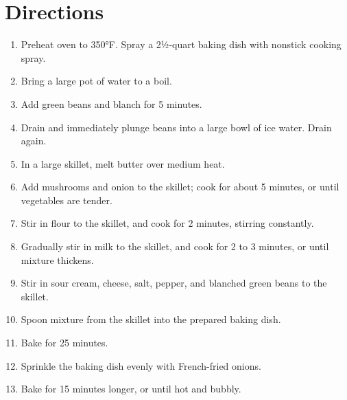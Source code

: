 \documentclass[11pt,letterpaper]{article}
\begin{document}
\section*{Directions}
\begin{enumerate}
    \item Preheat oven to 350°F. Spray a 2½-quart baking dish with nonstick cooking spray.
    \item Bring a large pot of water to a boil.
		\item Add green beans and blanch for 5 minutes.
		\item Drain and immediately plunge beans into a large bowl of ice water. Drain again.
    \item In a large skillet, melt butter over medium heat.
    \item Add mushrooms and onion to the skillet; cook for about 5 minutes, or until vegetables are tender.
    \item Stir in flour to the skillet, and cook for 2 minutes, stirring constantly.
    \item Gradually stir in milk to the skillet, and cook for 2 to 3 minutes, or until mixture thickens.
    \item Stir in sour cream, cheese, salt, pepper, and blanched green beans to the skillet.
    \item Spoon mixture from the skillet into the prepared baking dish.
    \item Bake for 25 minutes.
    \item Sprinkle the baking dish evenly with French-fried onions.
    \item Bake for 15 minutes longer, or until hot and bubbly.
\end{enumerate}
\end{document}
